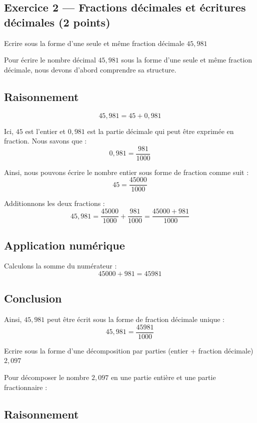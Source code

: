 \documentclass[answers]{exam}
\begin{document}
\subsection*{Exercice 2 — Fractions décimales et écritures décimales (2 points)}

\begin{questions}
  \question[0.5] Ecrire sous la forme d'une seule et même fraction décimale $45,981$
  

\begin{solution}
Pour écrire le nombre décimal \(45,981\) sous la forme d'une seule et même fraction décimale, nous devons d'abord comprendre sa structure.

\subsection*{Raisonnement}
\[ 
45,981 = 45 + 0,981 
\]

Ici, \(45\) est l'entier et \(0,981\) est la partie décimale qui peut être exprimée en fraction. Nous savons que :
\[
0,981 = \frac{981}{1000}
\]

Ainsi, nous pouvons écrire le nombre entier sous forme de fraction comme suit :
\[
45 = \frac{45000}{1000}
\]

Additionnons les deux fractions :
\[
45,981 = \frac{45000}{1000} + \frac{981}{1000} = \frac{45000 + 981}{1000} 
\]

\subsection*{Application numérique}
Calculons la somme du numérateur :
\[
45000 + 981 = 45981 
\]

\subsection*{Conclusion}
Ainsi, \(45,981\) peut être écrit sous la forme de fraction décimale unique :
\[
45,981 = \frac{45981}{1000}
\]
\end{solution}

\question[0.5] Ecrire sous la forme d'une décomposition par parties (entier + fraction décimale) $2,097$
  

\begin{solution}
Pour décomposer le nombre \(2,097\) en une partie entière et une partie fractionnaire :

\subsection*{Raisonnement}


\end{solution}
\end{questions}
\end{document}
